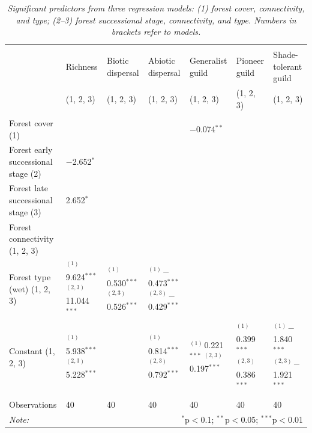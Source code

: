 \begin{table}[H] \centering
\vspace{-2ex}
\small
\caption{\textit{
Significant predictors from three regression models: (1) forest cover, connectivity, and type; (2–3) forest successional stage, connectivity, and type. Numbers in brackets refer to models.
}} 
\begin{tabularx}{\textwidth}{@{\extracolsep{5pt}}lXXXXXX} 
\\[-1.8ex]\hline 
\hline \\[-1.8ex] 
 & Richness & Biotic dispersal & Abiotic dispersal & Generalist guild & Pioneer guild & Shade-tolerant guild \\ 
 & \tiny{(1, 2, 3)} & \tiny{(1, 2, 3)} & \tiny{(1, 2, 3)} & \tiny{(1, 2, 3)} & \tiny{(1, 2, 3)} & \tiny{(1, 2, 3)} \\ 
\hline \\[-1ex] 
Forest cover \tiny{(1)} &  &  &  & $-$0.074$^{**}$ &  &  \\ 
Forest early successional stage \tiny{(2)} & $-$2.652$^{*}$ &  &  &  &  &  \\ 
Forest late successional stage \tiny{(3)} & 2.652$^{*}$ &  &  &  &  &  \\ 
Forest connectivity \tiny{(1, 2, 3)} &  &  &  &  &  &  \\ 
Forest type (wet) \tiny{(1, 2, 3)} & $^{(1)\,}$9.624$^{***}$  $^{(2, 3)\,}$11.044$^{***}$  & $^{(1)\,}$0.530$^{***}$ $^{(2,3)\,}$0.526$^{***}$ & $^{(1)\,}$$-$0.473$^{***}$ $^{(2, 3)\,}$$-$0.429$^{***}$ &  &  &  \\ 
Constant \tiny{(1, 2, 3)} & $^{(1)\,}$5.938$^{***}$ $^{(2, 3)\,}$5.228$^{***}$  &  & $^{(1)\,}$0.814$^{***}$ $^{(2, 3)\,}$0.792$^{***}$ & $^{(1)\,}$0.221$^{***}$ $^{(2, 3)\,}$0.197$^{***}$  & $^{(1)\,}$0.399$^{***}$ $^{(2, 3)\,}$0.386$^{***}$  & $^{(1)\,}$$-$1.840$^{***}$ $^{(2, 3)\,}$$-$1.921$^{***}$  \\ 
\hline \\[-1ex] 
Observations & 40 & 40 & 40 & 40 & 40 & 40 \\ 
\hline 
\textit{Note:} & \multicolumn{6}{r}{$^{*}$p$<$0.1; $^{**}$p$<$0.05; $^{***}$p$<$0.01} \\ 
\end{tabularx} 
\label{tab:sum_mods}
\end{table}


